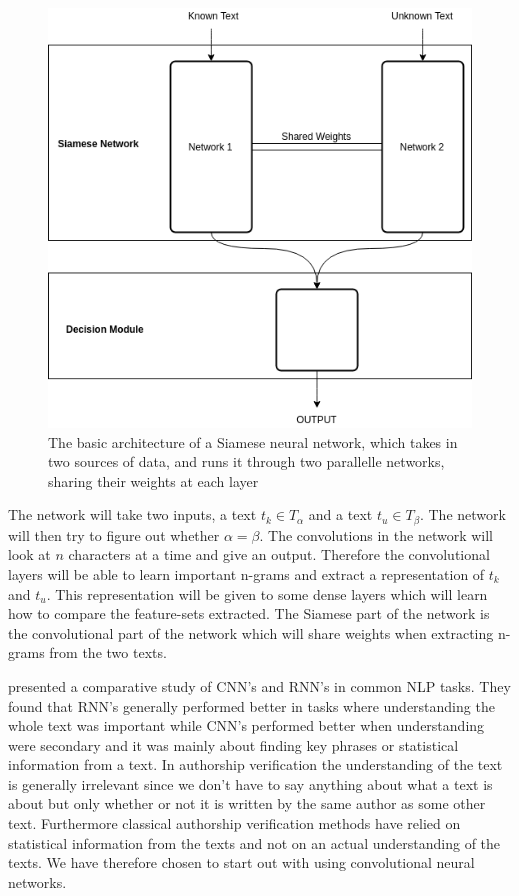 \begin{figure}
    \centering
    \includegraphics[scale=0.5]{./pictures/method/Siamese.png}
    \caption{The basic architecture of a Siamese neural network, which takes in
        two sources of data, and runs it through two parallelle networks,
        sharing their weights at each layer}
    \label{fig:siamese_example}
\end{figure}

The network will take two inputs, a text $t_k \in T_\alpha$ and a text $t_u
\in T_\beta$. The network will then try to figure out whether $\alpha =
\beta$. The convolutions in the network will look at $n$ characters at a
time and give an output. Therefore the convolutional layers will be able to
learn important n-grams and extract a representation of $t_k$ and $t_u$. This
representation will be given to some dense layers which will learn how to
compare the feature-sets extracted. The Siamese part of the network is the
convolutional part of the network which will share weights when extracting
n-grams from the two texts.

\cite{DBLP:journals/corr/0001KYS17} presented a comparative study of \gls{CNN}'s
and \gls{RNN}'s in common \gls{NLP} tasks. They found that \gls{RNN}'s generally
performed better in tasks where understanding the whole text was important while
\gls{CNN}'s performed better when understanding were secondary and it was mainly
about finding key phrases or statistical information from a text. In authorship
verification the understanding of the text is generally irrelevant since we
don't have to say anything about what a text is about but only whether or not
it is written by the same author as some other text. Furthermore classical
authorship verification methods have relied on statistical information from the
texts and not on an actual understanding of the texts. We have therefore chosen
to start out with using convolutional neural networks.

